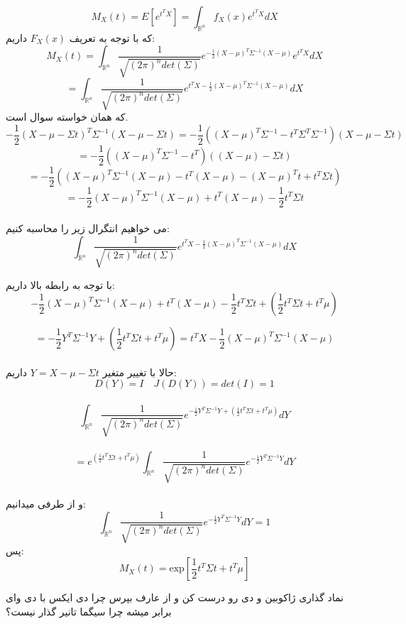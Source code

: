 \parte{}
\[M_X(t) = E[e^{t^{T}X}] = \int_{\mathbb{R}^{n}}{f_{X}(x) e^{t^{T}X}} dX \]
که با توجه به تعریف $F_X(x)$ داریم:
\[M_X(t) =  \int_{\mathbb{R}^{n}}{\frac{1}{\sqrt{(2\pi)^n det(\Sigma)}} e^{-\frac{1}{2}(X-\mu)^{T}\Sigma^{-1}(X-\mu)} e^{t^{T}X}} dX\]
\[ = \int_{\mathbb{R}^{n}}{\frac{1}{\sqrt{(2\pi)^n det(\Sigma)}} e^{t^{T}X-\frac{1}{2}(X-\mu)^{T}\Sigma^{-1}(X-\mu)}} dX \]
که همان خواسته سوال است.\\

\parte{}
\[ -\frac{1}{2}(X-\mu-\Sigma t)^{T}\Sigma^{-1}(X-\mu-\Sigma t) 
= -\frac{1}{2}((X-\mu)^{T}\Sigma^{-1}-t^{T}\Sigma^{T}\Sigma^{-1})(X-\mu-\Sigma t) \]
\[ 
= -\frac{1}{2}((X-\mu)^{T}\Sigma^{-1}-t^{T})((X-\mu)-\Sigma t) 
\]
\[ 
= -\frac{1}{2}((X-\mu)^{T}\Sigma^{-1}(X-\mu) -t^{T}(X-\mu) - (X-\mu)^{T}t +t^{T}\Sigma t)
\]
\[
= -\frac{1}{2}(X-\mu)^{T}\Sigma^{-1}(X-\mu) + t^{T}(X-\mu) -\frac{1}{2}t^{T}\Sigma t
\]\\

\parte{}
می خواهیم انتگرال زیر را محاسبه کنیم:
\[ \int_{\mathbb{R}^{n}}{\frac{1}{\sqrt{(2\pi)^n det(\Sigma)}} e^{t^{T}X-\frac{1}{2}(X-\mu)^{T}\Sigma^{-1}(X-\mu)}} dX \]

با توجه به رابطه بالا داریم:\\

\[
    -\frac{1}{2}(X-\mu)^{T}\Sigma^{-1}(X-\mu) + t^{T}(X-\mu) -\frac{1}{2}t^{T}\Sigma t
    +(\frac{1}{2}t^{T}\Sigma t + t^{T}\mu)
\]

\[
= -\frac{1}{2}Y^{T}{\Sigma}^{-1}Y +(\frac{1}{2}t^{T}\Sigma t + t^{T}\mu)
= t^{T}X-\frac{1}{2}(X-\mu)^{T}\Sigma^{-1}(X-\mu)
\]\\

حالا با تغییر متغیر $Y=X-\mu-\Sigma t$ داریم:\\

\[ 
    D(Y) = I \quad J(D(Y)) = det(I) = 1
\]\\

\[ 
    \int_{\mathbb{R}^{n}}{\frac{1}{\sqrt{(2\pi)^n det(\Sigma)}} e^{-\frac{1}{2}Y^{T}{\Sigma}^{-1}Y +(\frac{1}{2}t^{T}\Sigma t + t^{T}\mu)}} dY 
\]\\

\[
    = e^{(\frac{1}{2}t^{T}\Sigma t + t^{T}\mu)}\int_{\mathbb{R}^{n}}{\frac{1}{\sqrt{(2\pi)^n det(\Sigma)}} e^{-\frac{1}{2}Y^{T}{\Sigma}^{-1}Y }} dY 
\]\\
و از طرفی میدانیم:\\
\[ \int_{\mathbb{R}^{n}}{\frac{1}{\sqrt{(2\pi)^n det(\Sigma)}} e^{-\frac{1}{2}Y^{T}{\Sigma}^{-1}Y }} dY  = 1\]
پس:\\
\[ M_X(t) = \text{exp}[\frac{1}{2}t^{T}\Sigma t + t^{T}\mu]\]


نماد گذاری ژاکوبین و دی رو درست کن و از عارف بپرس چرا دی ایکس با دی وای برابر میشه چرا سیگما تانیر گذار نیست؟